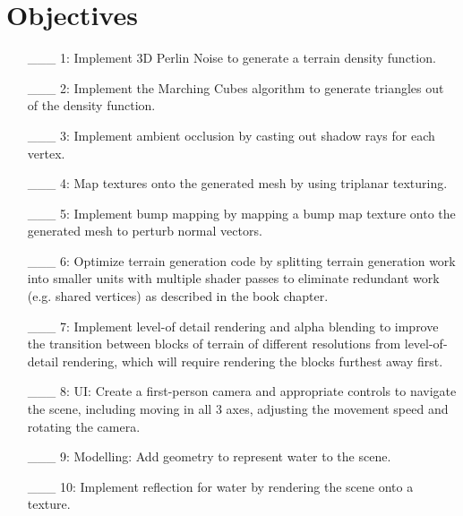 \documentclass {article}
\begin{document}
\section{Objectives}
\begin{enumerate}
 \item[\_\_\_ 1:]    Implement 3D Perlin Noise to generate a terrain density function.

 \item[\_\_\_ 2:]   Implement the Marching Cubes algorithm to generate triangles out of the density function.

 \item[\_\_\_ 3:]   Implement ambient occlusion by casting out shadow rays for each vertex.

 \item[\_\_\_ 4:]   Map textures onto the generated mesh by using triplanar texturing.

 \item[\_\_\_ 5:]   Implement bump mapping by mapping a bump map texture onto the generated mesh to perturb normal vectors.

 \item[\_\_\_ 6:]   Optimize terrain generation code by splitting terrain generation work into smaller units with multiple shader passes to eliminate redundant work (e.g. shared vertices) as described in the book chapter.

 \item[\_\_\_ 7:]   Implement level-of detail rendering and alpha blending to improve the transition between blocks of terrain of different resolutions from level-of-detail rendering, which will require rendering the blocks furthest away first.

 \item[\_\_\_ 8:]   UI: Create a first-person camera and appropriate controls to navigate the scene, including moving in all 3 axes, adjusting the movement speed and rotating the camera.

 \item[\_\_\_ 9:]   Modelling: Add geometry to represent water to the scene.

 \item[\_\_\_ 10:]  Implement reflection for water by rendering the scene onto a texture.
\end{enumerate}

\end{document}
